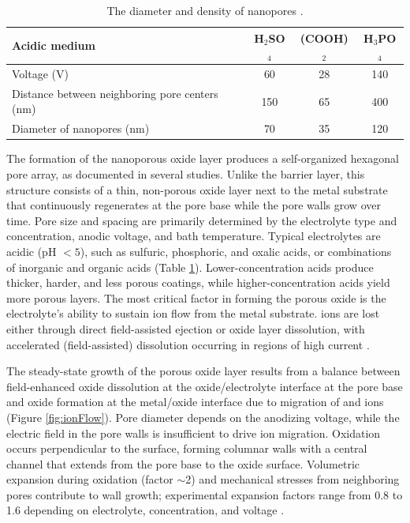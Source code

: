 \documentclass{rapportCS}
\begin{document}
	\begin{table}[h!]
		\centering
		\caption{The diameter and density of nanopores \cite{YANG2003440}.}
		\begin{tabular}{lccc}
			\toprule
			\textbf{Acidic medium} & \textbf{H$_2$SO$_4$} & \textbf{(COOH)$_2$} & \textbf{H$_3$PO$_4$} \\
			\midrule
			Voltage (V) & 60 & 28 & 140 \\
			Distance between neighboring pore centers (nm) & 150 & 65 & 400 \\
			Diameter of nanopores (nm) & 70 & 35 & 120 \\
			\bottomrule
		\end{tabular}
		\label{tab:nanopores}
	\end{table}
	
	
	The formation of the nanoporous oxide layer produces a self-organized hexagonal pore array, as documented in several studies. Unlike the barrier layer, this structure consists of a thin, non-porous oxide layer next to the metal substrate that continuously regenerates at the pore base while the pore walls grow over time. Pore size and spacing are primarily determined by the electrolyte type and concentration, anodic voltage, and bath temperature. Typical electrolytes are acidic (pH $< 5$), such as sulfuric, phosphoric, and oxalic acids, or combinations of inorganic and organic acids (Table \ref{tab:nanopores}). Lower-concentration acids produce thicker, harder, and less porous coatings, while higher-concentration acids yield more porous layers. The most critical factor in forming the porous oxide is the electrolyte’s ability to sustain  ion flow from the metal substrate.  ions are lost either through direct field-assisted ejection or oxide layer dissolution, with accelerated (field-assisted) dissolution occurring in regions of high current \cite{eessaa2023review}.
	
	The steady-state growth of the porous oxide layer results from a balance between field-enhanced oxide dissolution at the oxide/electrolyte interface at the pore base and oxide formation at the metal/oxide interface due to migration of  and  ions (Figure \ref{fig:ionFlow}). Pore diameter depends on the anodizing voltage, while the electric field in the pore walls is insufficient to drive ion migration. Oxidation occurs perpendicular to the surface, forming columnar walls with a central channel that extends from the pore base to the oxide surface. Volumetric expansion during oxidation (factor $\sim$2) and mechanical stresses from neighboring pores contribute to wall growth; experimental expansion factors range from 0.8 to 1.6 depending on electrolyte, concentration, and voltage \cite{eessaa2023review}.  
	
\end{document}
